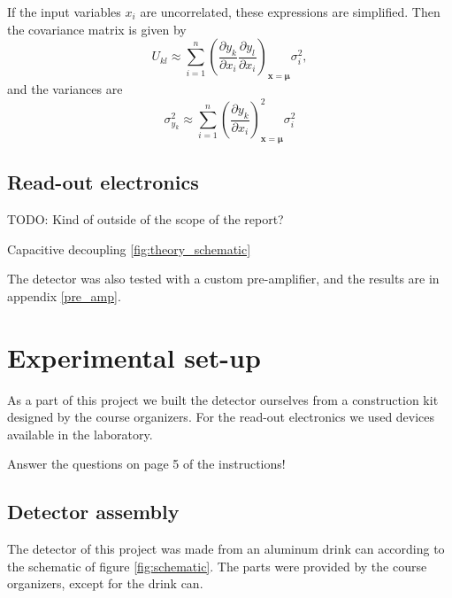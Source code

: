 \documentclass[a4paper]{article}
\begin{document}
If the input variables $x_i$ are uncorrelated, these expressions are simplified.
Then the covariance matrix is given by
\begin{equation}
U_{kl} \approx \sum_{i=1}^n \left( \frac{\partial y_k}{\partial x_i} \frac{\partial y_l}{\partial x_i} \right)_{\mathbf{x}=\mathbf{\mu}} \sigma_i^2,
\end{equation}
and the variances are
\begin{equation}
\sigma_{y_k}^2 \approx \sum_{i=1}^n \left( \frac{\partial y_k}{\partial x_i} \right)_{\mathbf{x}=\mathbf{\mu}}^2 \sigma_i^2
\end{equation}
\cite[p. 20--22]{cowan_statistical_1998}


\subsection{Read-out electronics}
\label{electronics}

TODO: Kind of outside of the scope of the report?

Capacitive decoupling \ref{fig:theory_schematic}

The detector was also tested with a custom pre-amplifier, and the results are in appendix \ref{pre_amp}.


\clearpage
\section{Experimental set-up}
\label{setup}
As a part of this project we built the detector ourselves from a construction kit designed by the course organizers.
For the read-out electronics we used devices available in the laboratory.

Answer the questions on page 5 of the instructions!


\subsection{Detector assembly}
\label{assembly}
The detector of this project was made from an aluminum drink can according to the schematic of figure \ref{fig:schematic}.
The parts were provided by the course organizers, except for the drink can.
\end{document}
